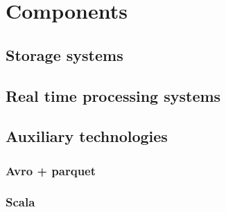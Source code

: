 \chapter{Components}
\label{chap:components}


\section{Storage systems}





\section{Real time processing systems}





\section{Auxiliary technologies}

\subsection{Avro + parquet}

\subsection{Scala}





